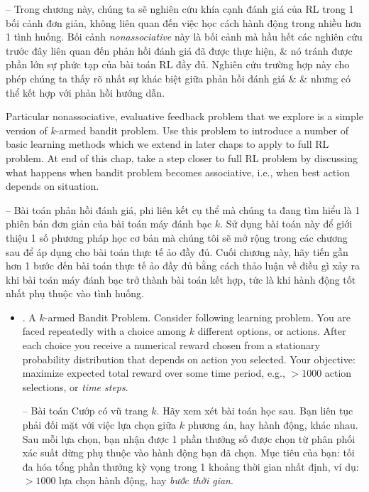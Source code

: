 \documentclass{article}
\begin{document}
\begin{itemize}
    -- Trong chương này, chúng ta sẽ nghiên cứu khía cạnh đánh giá của RL trong 1 bối cảnh đơn giản, không liên quan đến việc học cách hành động trong nhiều hơn 1 tình huống. Bối cảnh {\it nonassociative} này là bối cảnh mà hầu hết các nghiên cứu trước đây liên quan đến phản hồi đánh giá đã được thực hiện, \& nó tránh được phần lớn sự phức tạp của bài toán RL đầy đủ. Nghiên cứu trường hợp này cho phép chúng ta thấy rõ nhất sự khác biệt giữa phản hồi đánh giá \& \& nhưng có thể kết hợp với phản hồi hướng dẫn.

    Particular nonassociative, evaluative feedback problem that we explore is a simple version of $k$-armed bandit problem. Use this problem to introduce a number of basic learning methods which we extend in later chaps to apply to full RL problem. At end of this chap, take a step closer to full RL problem by discussing what happens when bandit problem becomes associative, i.e., when best action depends on situation.

    -- Bài toán phản hồi đánh giá, phi liên kết cụ thể mà chúng ta đang tìm hiểu là 1 phiên bản đơn giản của bài toán máy đánh bạc $k$. Sử dụng bài toán này để giới thiệu 1 số phương pháp học cơ bản mà chúng tôi sẽ mở rộng trong các chương sau để áp dụng cho bài toán thực tế ảo đầy đủ. Cuối chương này, hãy tiến gần hơn 1 bước đến bài toán thực tế ảo đầy đủ bằng cách thảo luận về điều gì xảy ra khi bài toán máy đánh bạc trở thành bài toán kết hợp, tức là khi hành động tốt nhất phụ thuộc vào tình huống.
    \begin{itemize}
        \item {. A $k$-armed Bandit Problem.} Consider following learning problem. You are faced repeatedly with a choice among $k$ different options, or actions. After each choice you receive a numerical reward chosen from a stationary probability distribution that depends on action you selected. Your objective: maximize expected total reward over some time period, e.g., $> 1000$ action selections, or {\it time steps}.

        -- {\sf Bài toán Cướp có vũ trang $k$.} Hãy xem xét bài toán học sau. Bạn liên tục phải đối mặt với việc lựa chọn giữa $k$ phương án, hay hành động, khác nhau. Sau mỗi lựa chọn, bạn nhận được 1 phần thưởng số được chọn từ phân phối xác suất dừng phụ thuộc vào hành động bạn đã chọn. Mục tiêu của bạn: tối đa hóa tổng phần thưởng kỳ vọng trong 1 khoảng thời gian nhất định, ví dụ: $> 1000$ lựa chọn hành động, hay {\it bước thời gian}.


\end{itemize}
\end{itemize}
\end{document}
